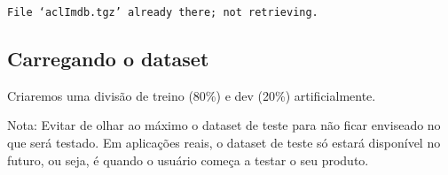 \documentclass[10pt]{article}
\begin{document}
    \begin{Verbatim}[commandchars=\\\{\}]
File ‘aclImdb.tgz’ already there; not retrieving.

    \end{Verbatim}

    \hypertarget{carregando-o-dataset}{%
\subsection{Carregando o dataset}\label{carregando-o-dataset}}

Criaremos uma divisão de treino (80\%) e dev (20\%) artificialmente.

Nota: Evitar de olhar ao máximo o dataset de teste para não ficar
enviseado no que será testado. Em aplicações reais, o dataset de teste
só estará disponível no futuro, ou seja, é quando o usuário começa a
testar o seu produto.
\end{document}
